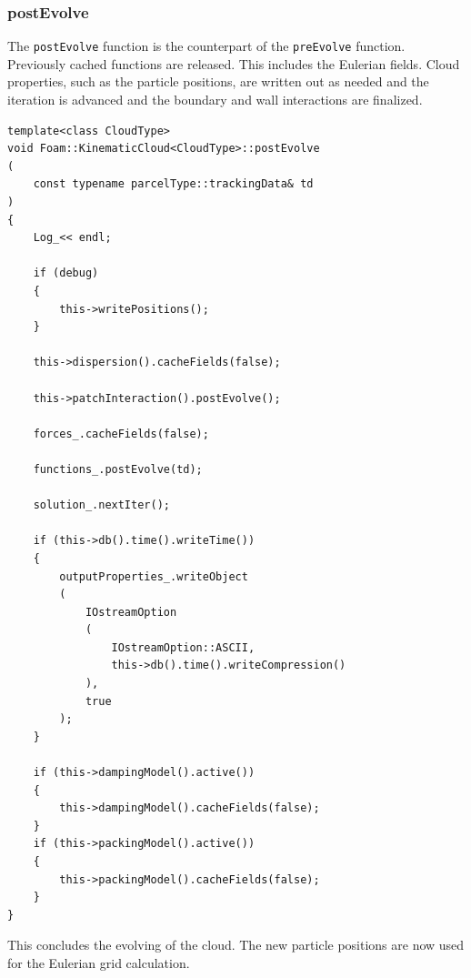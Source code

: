 \subsubsection{postEvolve}
The \lstinline|postEvolve| function is the counterpart of the \lstinline|preEvolve| function. Previously cached functions are released. This includes the Eulerian fields. Cloud properties, such as the particle positions, are written out as needed and the iteration is advanced and the boundary and wall interactions are finalized.
\ifcode
\begin{lstlisting}[firstline=266, caption=KinematicCloud.C]
template<class CloudType>
void Foam::KinematicCloud<CloudType>::postEvolve
(
    const typename parcelType::trackingData& td
)
{
    Log_<< endl;

    if (debug)
    {
        this->writePositions();
    }

    this->dispersion().cacheFields(false);

    this->patchInteraction().postEvolve();

    forces_.cacheFields(false);

    functions_.postEvolve(td);

    solution_.nextIter();

    if (this->db().time().writeTime())
    {
        outputProperties_.writeObject
        (
            IOstreamOption
            (
                IOstreamOption::ASCII,
                this->db().time().writeCompression()
            ),
            true
        );
    }

    if (this->dampingModel().active())
    {
        this->dampingModel().cacheFields(false);
    }
    if (this->packingModel().active())
    {
        this->packingModel().cacheFields(false);
    }
}    
\end{lstlisting}
\fi

This concludes the evolving of the cloud. The new particle positions are now used for the Eulerian grid calculation.
